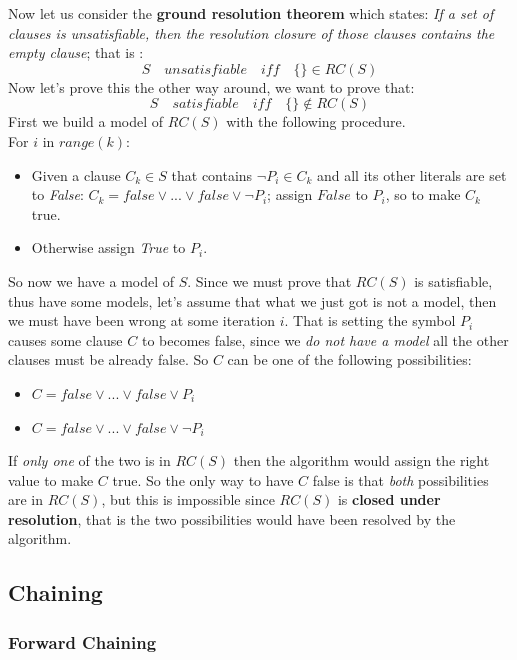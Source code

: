 \documentclass[10pt,a4paper]{article}
\begin{document}
Now let us consider the \textbf{ground resolution theorem} which states:
\textit{If a set of clauses is unsatisfiable, then the resolution closure of those clauses contains the empty clause}; that is :
\[S\quad unsatisfiable\quad iff\quad \{\}\in RC(S)\]
Now let's prove this the other way around, we want to prove that:
\[S\quad satisfiable\quad iff\quad \{\}\notin RC(S)\]
First we build a model of $RC(S)$ with the following procedure.\\ For $i$ in $range(k)$:
\begin{itemize}
\item Given a clause $C_k \in S$ that contains $\neg P_i \in C_k$ and all its other literals are set to \textit{False}: $C_k=false\vee...\vee false\vee \neg P_i$; assign $False$ to $P_i$, so to make $C_k$ true.
\item Otherwise assign \textit{True} to $P_i$.
\end{itemize}
So now we have a model of $S$. Since we must prove that $RC(S)$ is satisfiable, thus have some models, let's assume that what we just got is not a model, then we must have been wrong at some iteration $i$. That is setting the symbol $P_i$ causes some clause $C$ to becomes false, since we \textit{do not have a model} all the other clauses must be already false. So $C$ can be one of the following possibilities:
\begin{itemize}
\item $C=false\vee...\vee false\vee P_i$
\item $C=false\vee...\vee false\vee \neg P_i$
\end{itemize}
If \textit{only one} of the two is in $RC(S)$ then the algorithm would assign the right value to make $C$ true. So the only way to have $C$ false is that \textit{both} possibilities are in $RC(S)$, but this is impossible since $RC(S)$ is \textbf{closed under resolution}, that is the two possibilities would have been resolved by the algorithm.

\subsection{Chaining}
\label{subsec:chaining}


\subsubsection{Forward Chaining}
\end{document}
